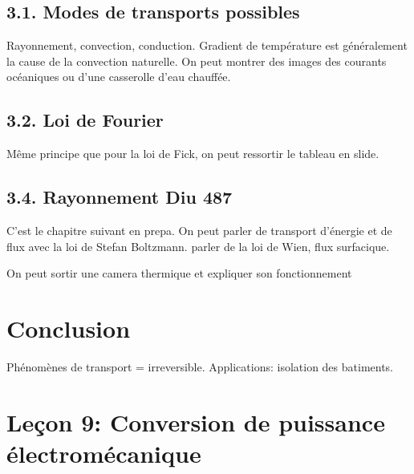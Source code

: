 \documentclass[french, a4paper, 10pt, twocolumn, landscape]{article}
\begin{document}
\subsection*{3.1. Modes de transports possibles}

Rayonnement, convection, conduction. Gradient de température est généralement la cause de la convection naturelle. On peut montrer des images des courants océaniques ou d'une casserolle d'eau chauffée.

\subsection*{3.2. Loi de Fourier}

Même principe que pour la loi de Fick, on peut ressortir le tableau en slide.




\subsection*{3.4. Rayonnement Diu 487}
C'est le chapitre suivant en prepa. On peut parler de transport d'énergie et de flux avec la loi de Stefan Boltzmann. parler de la loi de Wien, flux surfacique. 


On peut sortir une camera thermique et expliquer son fonctionnement


\section*{Conclusion}

Phénomènes de transport = irreversible. Applications: isolation des batiments. 

\clearpage

\section*{Leçon 9: Conversion de puissance électromécanique}
\end{document}
